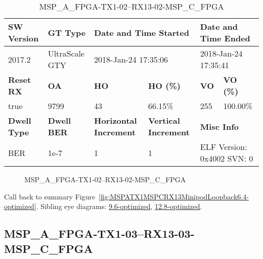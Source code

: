 \begin{table}[h]
\centering
\caption{MSP\_A\_FPGA-TX1-02--RX13-02-MSP\_C\_FPGA}
\label{tab:MSPAFPGATX102RX1302MSPCFPGA6.4-optimized}
\begin{tabular}{@{}|l|l|l|l|l|l|@{}}
\toprule
\textbf{SW Version}                & \textbf{GT Type}   & \multicolumn{2}{l|}{\textbf{Date and Time Started}}            & \multicolumn{2}{l|}{\textbf{Date and Time Ended}}        \\ \midrule
2017.2                       & UltraScale GTY          & \multicolumn{2}{l|}{2018-Jan-24 17:35:06}                   & \multicolumn{2}{l|}{2018-Jan-24 17:35:41}               \\ \midrule
\textbf{Reset RX}                  & \textbf{OA} & \textbf{HO}   & \textbf{HO (\%)} & \textbf{VO} & \textbf{VO (\%)} \\ \midrule
true & 9799        & 43          & 66.15\%        & 255        & 100.00\%       \\ \midrule
\textbf{Dwell Type}                & \textbf{Dwell BER} & \textbf{Horizontal Increment} & \textbf{Vertical Increment}    & \multicolumn{2}{l|}{\textbf{Misc Info}}                  \\ \midrule
BER                            & 1e-7        & 1        & 1           & \multicolumn{2}{l|}{ELF Version: 0x4002 SVN: 0}                         \\ \bottomrule
\end{tabular}
\end{table}

\begin{figure}[h]
\caption{MSP\_A\_FPGA-TX1-02--RX13-02-MSP\_C\_FPGA} \label{fig:MSPAFPGATX102RX1302MSPCFPGA6.4-optimized}
\end{figure}

Call back to summary Figure~\ref{fig:MSPATX1MSPCRX13MinipodLoopback6.4-optimized}.
Sibling eye diagrams: \hyperref[sec:MSPAFPGATX102RX1302MSPCFPGA9.6-optimized]{9.6-optimized}, \hyperref[sec:MSPAFPGATX102RX1302MSPCFPGA12.8-optimized]{12.8-optimized}.

\clearpage
\newpage


\subsection{MSP\_A\_FPGA-TX1-03--RX13-03-MSP\_C\_FPGA}\label{sec:MSPAFPGATX103RX1303MSPCFPGA6.4-optimized}

